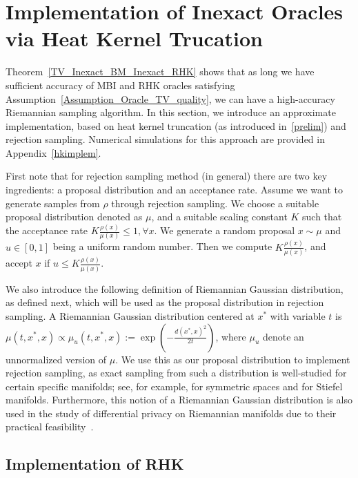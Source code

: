 \section{Implementation of Inexact Oracles via Heat Kernel Trucation}\label{Section_Oracle}

Theorem~\ref{TV_Inexact_BM_Inexact_RHK} shows that as long we have sufficient accuracy of MBI and RHK oracles satisfying Assumption~\ref{Assumption_Oracle_TV_quality}, we can have a high-accuracy Riemannian sampling algorithm. In this section, we introduce an approximate implementation, based on heat kernel truncation (as introduced in~\ref{prelim}) and rejection sampling. Numerical simulations for this approach are provided in Appendix~\ref{hkimplem}.

First note that for rejection sampling method (in general) there are two key ingredients: a proposal distribution and an acceptance rate. 
Assume we want to generate samples from $\rho$ through rejection sampling.
We choose a suitable proposal distribution denoted as $\mu$, and a suitable scaling constant $K$ 
such that the acceptance rate $K\frac{\rho(x)}{\mu(x)} \le 1, \forall x$.
We generate a random proposal $x \sim \mu$ and $u \in [0, 1]$ being a uniform random number. 
Then we compute $K\frac{\rho(x)}{\mu(x)}$, and accept $x$ if $u \le K\frac{\rho(x)}{\mu(x)}$.

We also introduce the following definition of Riemannian Gaussian distribution, as defined next, which will be used as the proposal distribution in rejection sampling. A Riemannian Gaussian distribution centered at $x^{*}$ with variable $t$ is  $
    \mu(t, x^{*}, x) \propto \mu_{u}(t, x^{*}, x) := \exp\left(-\frac{d(x^{*}, x)^{2}}{2t}\right)$, where $\mu_{u}$ denote an unnormalized version of $\mu$. We use this as our proposal distribution to implement rejection sampling, as exact sampling from such a distribution is  well-studied for certain specific manifolds;
see, for example, \cite{said2017gaussian} for symmetric spaces and \cite{chakraborty2019statistics} for Stiefel manifolds. Furthermore, this notion of a Riemannian Gaussian distribution is also used in the study of differential privacy on Riemannian manifolds due to their practical feasibility~\citep{reimherr2021differential,jiang2023gaussian}. 


\subsection{Implementation of RHK}
 
